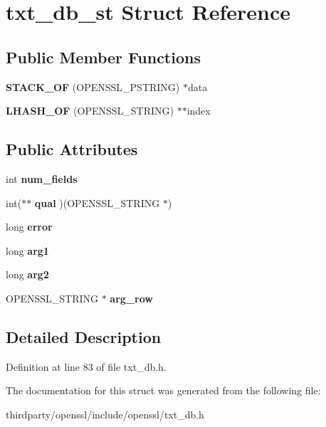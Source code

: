 \hypertarget{structtxt__db__st}{}\section{txt\+\_\+db\+\_\+st Struct Reference}
\label{structtxt__db__st}
\subsection*{Public Member Functions}
\begin{DoxyCompactItemize}
\item 
\mbox{\label{structtxt__db__st_a41f7b73f92447ce98883e1449815a50b}} 
{\bfseries S\+T\+A\+C\+K\+\_\+\+OF} (O\+P\+E\+N\+S\+S\+L\+\_\+\+P\+S\+T\+R\+I\+NG) $\ast$data
\item 
\mbox{\label{structtxt__db__st_acbdb24082dd01585b01e1538253bf622}} 
{\bfseries L\+H\+A\+S\+H\+\_\+\+OF} (O\+P\+E\+N\+S\+S\+L\+\_\+\+S\+T\+R\+I\+NG) $\ast$$\ast$index
\end{DoxyCompactItemize}
\subsection*{Public Attributes}
\begin{DoxyCompactItemize}
\item 
\mbox{\label{structtxt__db__st_ac5e40d76de4af9e3eb8126c5c71f35ee}} 
int {\bfseries num\+\_\+fields}
\item 
\mbox{\label{structtxt__db__st_af87dc62965306c802fc5d25b33eb0ffd}} 
int($\ast$$\ast$ {\bfseries qual} )(O\+P\+E\+N\+S\+S\+L\+\_\+\+S\+T\+R\+I\+NG $\ast$)
\item 
\mbox{\label{structtxt__db__st_addce5883079df416612638f30157ba9d}} 
long {\bfseries error}
\item 
\mbox{\label{structtxt__db__st_ae3f2f91927e152a865eecf288a8a5190}} 
long {\bfseries arg1}
\item 
\mbox{\label{structtxt__db__st_ae99864667eb99fd2d18fc91293df6249}} 
long {\bfseries arg2}
\item 
\mbox{\label{structtxt__db__st_a67601c6116a02bdb8ca45dc529da3255}} 
O\+P\+E\+N\+S\+S\+L\+\_\+\+S\+T\+R\+I\+NG $\ast$ {\bfseries arg\+\_\+row}
\end{DoxyCompactItemize}


\subsection{Detailed Description}


Definition at line 83 of file txt\+\_\+db.\+h.



The documentation for this struct was generated from the following file\+:\begin{DoxyCompactItemize}
\item 
thirdparty/openssl/include/openssl/txt\+\_\+db.\+h\end{DoxyCompactItemize}
